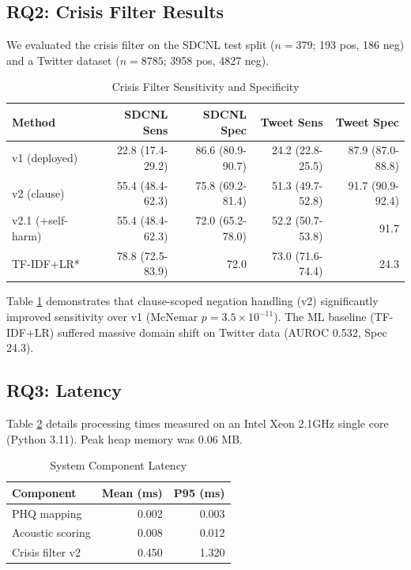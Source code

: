 \documentclass[conference]{IEEEtran}
\begin{document}
\subsection{RQ2: Crisis Filter Results}
We evaluated the crisis filter on the SDCNL \cite{sdcnl_paper} test split ($n=379$; 193 pos, 186 neg) and a Twitter dataset \cite{twitter_dataset} ($n=8785$; 3958 pos, 4827 neg). 
\begin{table}[htbp]
\caption{Crisis Filter Sensitivity and Specificity}
\label{tab:crisis_filter}
\centering
\begin{tabular}{lrrrr}
\toprule
\textbf{Method} & \textbf{SDCNL Sens} & \textbf{SDCNL Spec} & \textbf{Tweet Sens} & \textbf{Tweet Spec} \\
\midrule
v1 (deployed) & 22.8 (17.4-29.2) & 86.6 (80.9-90.7) & 24.2 (22.8-25.5) & 87.9 (87.0-88.8) \\
v2 (clause) & 55.4 (48.4-62.3) & 75.8 (69.2-81.4) & 51.3 (49.7-52.8) & 91.7 (90.9-92.4) \\
v2.1 (+self-harm) & 55.4 (48.4-62.3) & 72.0 (65.2-78.0) & 52.2 (50.7-53.8) & 91.7 \\
TF-IDF+LR* & 78.8 (72.5-83.9) & 72.0 & 73.0 (71.6-74.4) & 24.3 \\
\bottomrule
\end{tabular}
\end{table}
Table \ref{tab:crisis_filter} demonstrates that clause-scoped negation handling (v2) significantly improved sensitivity over v1 (McNemar $p=3.5 \times 10^{-11}$). The ML baseline (TF-IDF+LR) suffered massive domain shift on Twitter data (AUROC 0.532, Spec 24.3).

\subsection{RQ3: Latency}
Table \ref{tab:latency} details processing times measured on an Intel Xeon 2.1GHz single core (Python 3.11). Peak heap memory was 0.06 MB.
\begin{table}[htbp]
\caption{System Component Latency}
\label{tab:latency}
\centering
\begin{tabular}{lrr}
\toprule
\textbf{Component} & \textbf{Mean (ms)} & \textbf{P95 (ms)} \\
\midrule
PHQ mapping & 0.002 & 0.003 \\
Acoustic scoring & 0.008 & 0.012 \\
Crisis filter v2 & 0.450 & 1.320 \\
\bottomrule
\end{tabular}
\end{table}
\end{document}

